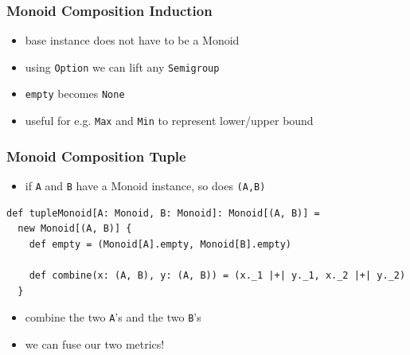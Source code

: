 \documentclass[aspectratio=169]{beamer}
\begin{document}
\begin{frame}
  \frametitle{Monoid Composition \textemdash{} Induction}
  \begin{itemize}
  \item base instance does not have to be a Monoid
  \item using \texttt{Option} we can lift any \texttt{Semigroup}
  \item \texttt{empty} becomes \texttt{None}
  \item useful for e.g. \texttt{Max} and \texttt{Min} to represent lower/upper bound
  \end{itemize}
\end{frame}

\begin{frame}[fragile]
  \frametitle{Monoid Composition \textemdash{} Tuple}
  \begin{itemize}
  \item if \texttt{A} and \texttt{B} have a Monoid instance, so does \texttt{(A,B)}
  \end{itemize}
  \begin{verbatim}
def tupleMonoid[A: Monoid, B: Monoid]: Monoid[(A, B)] =
  new Monoid[(A, B)] {
    def empty = (Monoid[A].empty, Monoid[B].empty)

    def combine(x: (A, B), y: (A, B)) = (x._1 |+| y._1, x._2 |+| y._2)
  }
  \end{verbatim}
  \begin{itemize}
  \item combine the two \texttt{A}'s and the two \texttt{B}'s
  \item we can fuse our two metrics!
  \end{itemize}
\end{frame}
\end{document}
